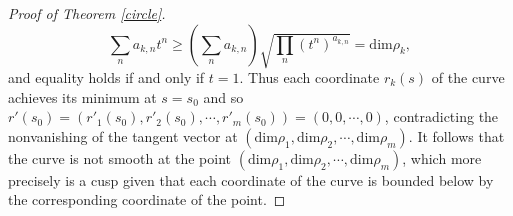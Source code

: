 \documentclass[10pt,a4paper]{amsart}
\begin{document}
\begin{proof}[Proof of Theorem \ref{circle}]
\[\displaystyle\sum_n a_{k, n}t^n\geq\left(\sum_n a_{k, n}\right)\sqrt{\prod_n (t^n)^{a_{k, n}}}=\text{dim}\rho_k,\] 
and equality holds if and only if $t=1$. Thus each coordinate $r_k(s)$ of the curve achieves its minimum at $s=s_0$ and so $r'(s_0)=(r'_1(s_0), r'_2(s_0), \cdots, r'_m(s_0))=(0, 0, \cdots, 0)$, contradicting the nonvanishing of the tangent vector at $(\text{dim}\rho_1, \text{dim}\rho_2, \cdots, \text{dim}\rho_m)$. It follows that the curve is not smooth at the point $(\text{dim}\rho_1, \text{dim}\rho_2, \cdots, \text{dim}\rho_m)$, which more precisely is a cusp given that each coordinate of the curve is bounded below by the corresponding coordinate of the point.
\end{proof}
\end{document}
